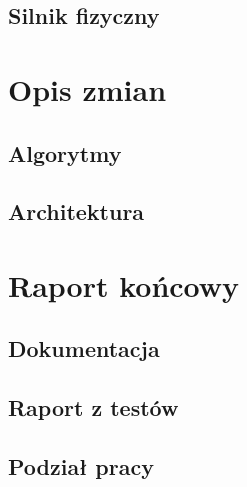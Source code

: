 \documentclass[a4paper,titlepage,10pt]{report}
\begin{document}
	\section{Silnik fizyczny}\label{sec:silnik fizyczny}
	

	\chapter{Opis zmian}\label{chap:opis zmian}
	\section{Algorytmy}\label{sec:algorytmy}
	
	\section{Architektura}\label{sec:architektura-zmiany}
	

	\chapter{Raport końcowy}\label{chap:raport końcowy}
	\section{Dokumentacja}\label{sec:dokumentacja}
	
	\section{Raport z testów}\label{sec:raport z testów}
	
	\section{Podział pracy}\label{sec:podzial}
	

	\newpage
	
	\newpage
\end{document}
